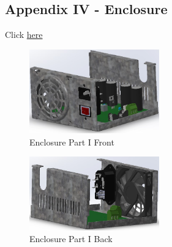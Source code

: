 \documentclass[11pt]{article}
\begin{document}
\subsection{Appendix IV - Enclosure}
Click \textcolor{blue}{\hyperlink{page.12}{here}}
\label{sec:enc}
\begin{multicols}{2}
\begin{figure}[H]
    \centering
    \includegraphics[width=0.5\textwidth]{enclosure photos/sss1.jpg}
    \caption{Enclosure Part I Front}
\end{figure}

\begin{figure}[H]
    \centering
    \includegraphics[width=0.5\textwidth]{enclosure photos/sss2.jpg}
    \caption{Enclosure Part I Back}
\end{figure}
\end{multicols}
\end{document}
